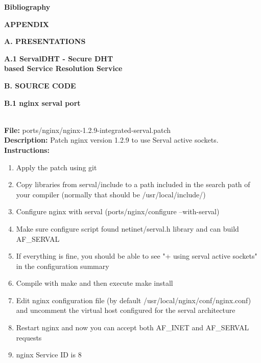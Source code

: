 \documentclass[12pt,a4paper,oneside]{article}
\begin{document}
\newpage
{}
{}
{\Huge \bf \noindent Bibliography}
\nocite{*}

\renewcommand{\refname}{}



\newpage
\pagestyle{empty}
{\Huge \bf \noindent APPENDIX}
{}
\newpage

\newpage
{\Huge \bf \noindent A. PRESENTATIONS}
{}

\newpage
{}
{\huge \bf \noindent A.1 ServalDHT - Secure DHT\\[0.2cm] based Service Resolution Service}
\label{sec:servaldhtpres}



\newpage
{\Huge \bf \noindent B. SOURCE CODE}
{}
\label{sec:sourcecode}


\newpage
{\huge \bf \noindent B.1 nginx serval port}
\\[0.5cm]
\textbf{File:} ports/nginx/nginx-1.2.9-integrated-serval.patch\\
\textbf{Description:} Patch nginx version 1.2.9 to use Serval active sockets. \\
\textbf{Instructions: }
\begin{enumerate} \itemsep1pt \parskip0pt 
	\item Apply the patch using git
	\item Copy libraries from serval/include to a path included in the search path of your compiler (normally that should be /usr/local/include/)
	\item Configure nginx with serval (ports/nginx/configure --with-serval)
	\item Make sure configure script found netinet/serval.h library and can build AF\_SERVAL
	\item If everything is fine, you should be able to see "+ using serval active sockets" in the configuration summary
	\item Compile with make and then execute make install
	\item Edit nginx configuration file (by default /usr/local/nginx/conf/nginx.conf) and uncomment the virtual host configured for the serval architecture
	\item Restart nginx and now you can accept both AF\_INET and AF\_SERVAL requests
	\item nginx Service ID is 8\\[0.5cm]
\end{enumerate}

\end{document}
